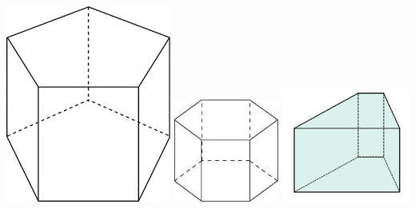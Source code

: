 \begin{itemize}
\includegraphics[scale=0.3]{RepS-pentagonale.png} 
\hspace*{1cm}
\includegraphics[scale=0.6]{RepS-prisme_hexagonale.jpg}
\hspace*{0.5cm} 
\includegraphics[scale=0.6]{RepS-pirsme_quelconque.png} 
\end{itemize}